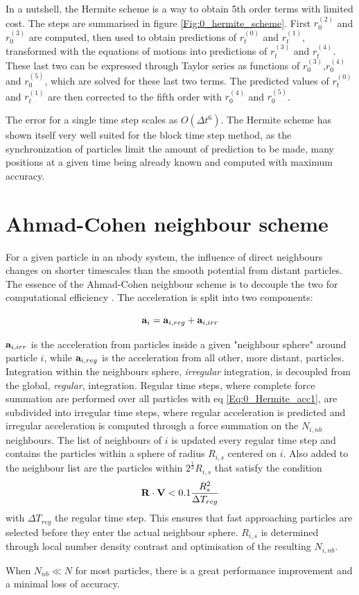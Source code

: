 In a nutshell, the Hermite scheme is a way to obtain 5th order terms with limited cost. The steps are summarised in figure \ref{Fig:0_hermite_scheme}. First $r_0^{(2)}$ and $r_0^{(3)}$ are computed, then used to obtain predictions of $r_t^{(0)}$ and $r_t^{(1)}$, transformed with the equations of motions into predictions of $r_t^{(3)}$ and $r_t^{(4)}$. These last two can be expressed through Taylor series as functions of $r_0^{(3)}$,$r_0^{(4)}$ and $r_0^{(5)}$, which are solved for these last two terms. The predicted values of $r_t^{(0)}$ and $r_t^{(1)}$ are then corrected to the fifth order with $r_0^{(4)}$ and $r_0^{(5)}$.

The error for a single time step scales as $O(\Delta t^6)$. The Hermite scheme has shown itself very well suited for the block time step method, as the synchronization of particles limit the amount of prediction to be made, many positions at a given time being already known and computed with maximum accuracy.


\section{Ahmad-Cohen neighbour scheme}

For a given particle in an nbody system, the influence of direct neighbours changes on shorter timescales than the smooth potential from distant particles. The essence of the Ahmad-Cohen neighbour scheme is to decouple the two for computational efficiency \citep{AhmadCohen1973}. The acceleration is split into two components:

\begin{equation}
\bold{a}_i = \bold{a}_{i,reg} + \bold{a}_{i,irr}
\end{equation}

$\bold{a}_{i,irr}$ is the acceleration from particles inside a given "neighbour sphere" around particle $i$, while $\bold{a}_{i,reg}$ is the acceleration from all other, more distant, particles. Integration within the neighbours sphere,  \textit{irregular} integration, is decoupled from the global, \textit{regular}, integration. Regular time steps, where complete force summation are performed over all particles with eq \ref{Eq:0_Hermite_acc1}, are subdivided into irregular time steps, where regular acceleration is predicted and irregular acceleration is computed through a force summation on the $N_{i,nb}$ neighbours. The list of neighbours of $i$ is updated every regular time step and contains the particles within a sphere of radius $R_{i,s}$ centered on $i$. Also added to the neighbour list are the particles within $2^{\frac{1}{3}}R_{i,s} $ that satisfy the condition
\begin{equation}
\bold{R} \cdot \bold{V} < 0.1 \frac{R_s^2}{\Delta T_{reg}}
\end{equation}
with $\Delta T_{reg}$ the regular time step. This ensures that fast approaching particles are selected before they enter the actual neighbour sphere. $R_{i,s}$ is determined through local number density contrast and optimisation of the resulting $N_{i,nb}$. 

When $N_{nb} \ll N$ for most particles, there is a great performance improvement and a minimal loss of accuracy. 












